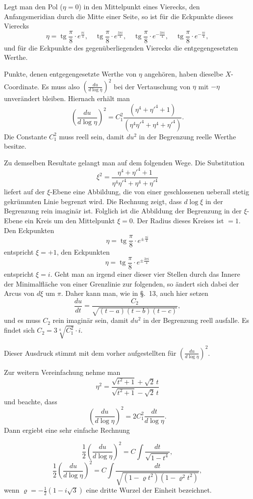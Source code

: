 \documentclass[12pt,a4paper]{article}
\DeclareMathOperator{\tg}{tg}
\begin{document}
Legt man den Pol ($\eta = 0$) in den Mittelpunkt eines Vierecks, den Anfangsmeridian durch die Mitte einer Seite, so ist f\"ur die Eckpunkte dieses Vierecks
\[\eta = \tg\frac{\pi}{8} \cdot e^{\frac{\pi i}{4}}, \quad \tg\frac{\pi}{8} \cdot e^{\frac{3\pi i}{4}}, \quad \tg\frac{\pi}{8} \cdot e^{-\frac{3\pi i}{4}}, \quad \tg\frac{\pi}{8} \cdot e^{-\frac{\pi i}{4}},\]
und f\"ur die Eckpunkte des gegen\"uberliegenden Vierecks die entgegengesetzten Werthe.

\newpage
Punkte, denen entgegengesetzte Werthe von $\eta$ angeh\"oren, haben dieselbe $X$-Coordinate. Es muss also $\left(\frac{du}{d\log\eta}\right)^{2}$ bei der Vertauschung von $\eta$ mit $-\eta$ unver\"andert bleiben. Hiernach erh\"alt man
\[\left(\frac{du}{d\log\eta}\right)^{2} = C_{1}^{2} \frac{(\eta^{4}+\eta'^{4}+1)}{(\eta^{4}\eta'^{4}+\eta^{4}+\eta'^{4})}.\]
Die Constante $C_{1}^{2}$ muss reell sein, damit $du^{2}$ in der Begrenzung reelle Werthe besitze.

Zu demselben Resultate gelangt man auf dem folgenden Wege. Die Substitution
\[\xi^{2} = \frac{\eta^{4}+\eta'^{4}+1}{\eta^{4}\eta'^{4}+\eta^{4}+\eta'^{4}}\]
liefert auf der $\xi$-Ebene eine Abbildung, die von einer geschlossenen ueberall stetig gekr\"ummten Linie begrenzt wird. Die Rechnung zeigt, dass $d\log\xi$ in der Begrenzung rein imagin\"ar ist. Folglich ist die Abbildung der Begrenzung in der $\xi$-Ebene ein Kreis um den Mittelpunkt $\xi = 0$. Der Radius dieses Kreises ist $=1$. Den Eckpunkten
\[\eta = \tg\frac{\pi}{8} \cdot e^{\pm\frac{\pi i}{4}}\]
entspricht $\xi = +1$, den Eckpunkten
\[\eta = \tg\frac{\pi}{8} \cdot e^{\pm\frac{3\pi i}{4}}\]
entspricht $\xi = i$. Geht man an irgend einer dieser vier Stellen durch das Innere der Minimalfl\"ache von einer Grenzlinie zur folgenden, so \"andert sich dabei der Arcus von $d\xi$ um $\pi$. Daher kann man, wie in \S.~13, auch hier setzen
\[\frac{du}{dt} = \frac{C_{2}}{\sqrt{(t-a)(t-b)(t-c)}},\]
und es muss $C_{2}$ rein imagin\"ar sein, damit $du^{2}$ in der Begrenzung reell ausfalle. Es findet sich $C_{2} = 3\sqrt[4]{C_{1}^{2}} \cdot i$.

Dieser Ausdruck stimmt mit dem vorher aufgestellten f\"ur $\left(\frac{du}{d\log\eta}\right)^{2}$.

Zur weitern Vereinfachung nehme man
\[\eta^{2} = \frac{\sqrt{t^{2}+1} + \sqrt{2}\, t}{\sqrt{t^{2}+1} - \sqrt{2}\, t}\]
und beachte, dass
\[\left(\frac{du}{d\log\eta}\right)^{2} = 2C_{1}^{2} \frac{dt}{d\log\eta}.\]
Dann ergiebt eine sehr einfache Rechnung

\newpage
\begin{equation}\tag{h}
\frac{1}{2} \left(\frac{du}{d\log\eta}\right)^{2} = C \int \frac{dt}{\sqrt{1-t^{4}}},
\end{equation}
\[\frac{1}{2} \left(\frac{du}{d\log\eta}\right)^{2} = C \int \frac{dt}{\sqrt{(1-\varrho t^{2})(1-\varrho^{2}t^{2})}},\]
wenn $\varrho = -\frac{1}{2}(1-i\sqrt{3})$ eine dritte Wurzel der Einheit bezeichnet.
\end{document}
